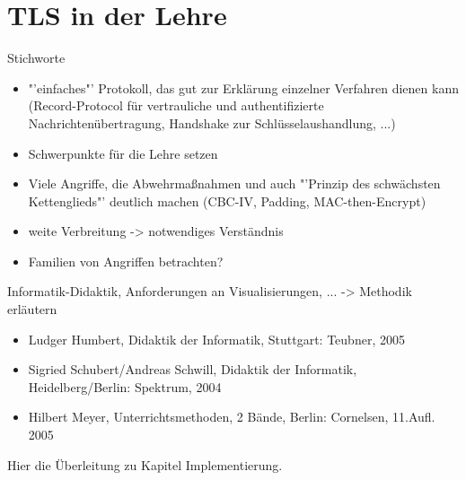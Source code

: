 \chapter{TLS in der Lehre}

Stichworte

\begin{itemize}
	\item "'einfaches"' Protokoll, das gut zur Erklärung einzelner Verfahren dienen kann (Record-Protocol für vertrauliche und authentifizierte Nachrichtenübertragung, Handshake zur Schlüsselaushandlung, ...)
	\item Schwerpunkte für die Lehre setzen
	\item Viele Angriffe, die Abwehrmaßnahmen und auch "'Prinzip des schwächsten Kettenglieds"' deutlich machen (CBC-IV, Padding, MAC-then-Encrypt)
	\item weite Verbreitung -> notwendiges Verständnis
	\item Familien von Angriffen betrachten?
\end{itemize}

Informatik-Didaktik, Anforderungen an Visualisierungen, ... -> Methodik erläutern

\begin{itemize}
\item Ludger Humbert, Didaktik der Informatik, Stuttgart: Teubner, 2005
\item Sigried Schubert/Andreas Schwill, Didaktik der Informatik, Heidelberg/Berlin: Spektrum, 2004
\item Hilbert Meyer, Unterrichtsmethoden, 2 Bände, Berlin: Cornelsen, 11.Aufl. 2005
\end{itemize}

Hier die Überleitung zu Kapitel Implementierung. 